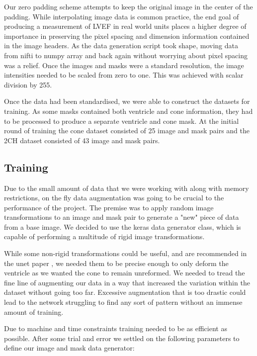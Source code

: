 \documentclass[12pt]{article}
\begin{document}
Our zero padding scheme attempts to keep the original image in the center of the padding.
While interpolating image data is common practice, the end goal of producing a measurement of LVEF in real world units places a higher degree of importance in preserving the pixel spacing and dimension information contained in the image headers.
As the data generation script took shape, moving data from nifti to numpy array and back again without worrying about pixel spacing was a relief.
Once the images and masks were a standard resolution, the image intensities needed to be scaled from zero to one. This was achieved with scalar division by 255.
\par
Once the data had been standardised, we were able to construct the datasets for training.
As some masks contained both ventricle and cone information, they had to be processed to produce a separate ventricle and cone mask.
At the initial round of training the cone dataset consisted of 25 image and mask pairs and the 2CH dataset consisted of 43 image and mask pairs.

\par

\subsection{Training}
Due to the small amount of data that we were working with along with memory restrictions, on the fly data augmentation was going to be crucial to the performance of the project.
The premise was to apply random image transformations to an image and mask pair to generate a "new" piece of data from a base image.
We decided to use the keras data generator class, which is capable of performing a multitude of rigid image transformations. 
\par 
While some non-rigid transformations could be useful, and are recommended in the unet paper \cite{unet}, we needed them to be precise enough to only deform the ventricle as we wanted the cone to remain unreformed.
We needed to tread the fine line of augmenting our data in a way that increased the variation within the dataset without going too far.
Excessive augmentation that is too drastic could lead to the network struggling to find any sort of pattern without an immense amount of training.
\par 
Due to machine and time constraints training needed to be as efficient as possible.
After some trial and error we settled on the following parameters to define our image and mask data generator:
\end{document}
